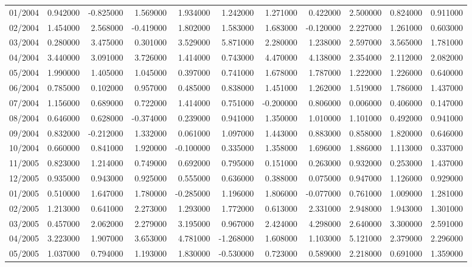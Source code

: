 \begin{tabular}{lrrrrrrrrrr}
01/2004 & 0.942000 & -0.825000 & 1.569000 & 1.934000 & 1.242000 & 1.271000 & 0.422000 & 2.500000 & 0.824000 & 0.911000 \\
02/2004 & 1.454000 & 2.568000 & -0.419000 & 1.802000 & 1.583000 & 1.683000 & -0.120000 & 2.227000 & 1.261000 & 0.603000 \\
03/2004 & 0.280000 & 3.475000 & 0.301000 & 3.529000 & 5.871000 & 2.280000 & 1.238000 & 2.597000 & 3.565000 & 1.781000 \\
04/2004 & 3.440000 & 3.091000 & 3.726000 & 1.414000 & 0.743000 & 4.470000 & 4.138000 & 2.354000 & 2.112000 & 2.082000 \\
05/2004 & 1.990000 & 1.405000 & 1.045000 & 0.397000 & 0.741000 & 1.678000 & 1.787000 & 1.222000 & 1.226000 & 0.640000 \\
06/2004 & 0.785000 & 0.102000 & 0.957000 & 0.485000 & 0.838000 & 1.451000 & 1.262000 & 1.519000 & 1.786000 & 1.437000 \\
07/2004 & 1.156000 & 0.689000 & 0.722000 & 1.414000 & 0.751000 & -0.200000 & 0.806000 & 0.006000 & 0.406000 & 0.147000 \\
08/2004 & 0.646000 & 0.628000 & -0.374000 & 0.239000 & 0.941000 & 1.350000 & 1.010000 & 1.101000 & 0.492000 & 0.941000 \\
09/2004 & 0.832000 & -0.212000 & 1.332000 & 0.061000 & 1.097000 & 1.443000 & 0.883000 & 0.858000 & 1.820000 & 0.646000 \\
10/2004 & 0.660000 & 0.841000 & 1.920000 & -0.100000 & 0.335000 & 1.358000 & 1.696000 & 1.886000 & 1.113000 & 0.337000 \\
11/2005 & 0.823000 & 1.214000 & 0.749000 & 0.692000 & 0.795000 & 0.151000 & 0.263000 & 0.932000 & 0.253000 & 1.437000 \\
12/2005 & 0.935000 & 0.943000 & 0.925000 & 0.555000 & 0.636000 & 0.388000 & 0.075000 & 0.947000 & 1.126000 & 0.929000 \\
01/2005 & 0.510000 & 1.647000 & 1.780000 & -0.285000 & 1.196000 & 1.806000 & -0.077000 & 0.761000 & 1.009000 & 1.281000 \\
02/2005 & 1.213000 & 0.641000 & 2.273000 & 1.293000 & 1.772000 & 0.613000 & 2.331000 & 2.948000 & 1.943000 & 1.301000 \\
03/2005 & 0.457000 & 2.062000 & 2.279000 & 3.195000 & 0.967000 & 2.424000 & 4.298000 & 2.640000 & 3.300000 & 2.591000 \\
04/2005 & 3.223000 & 1.907000 & 3.653000 & 4.781000 & -1.268000 & 1.608000 & 1.103000 & 5.121000 & 2.379000 & 2.296000 \\
05/2005 & 1.037000 & 0.794000 & 1.193000 & 1.830000 & -0.530000 & 0.723000 & 0.589000 & 2.218000 & 0.691000 & 1.359000 \\

\end{tabular}
